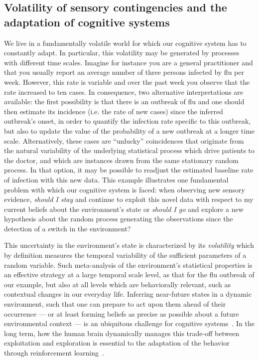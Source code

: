 \documentclass[10pt,letterpaper]{article}
\newcommand{\citep}[1]{\cite{#1}}
\newcommand{\LP}[1]{\textbf{\textcolor{red}{[LP: #1]}}}
\newcommand{\Rone}[1]{\textbf{\textcolor{magenta}{[rev 1: #1]}}}
\begin{document}
\subsection{Volatility of sensory contingencies and the adaptation of cognitive systems}
We live in a fundamentally volatile world for which
our cognitive system has to constantly adapt.
In particular, this volatility may be generated
by processes with different time scales.
Imagine for instance you are a general practitioner and
that you usually report an average number of
three persons infected by flu per week.
However, this rate is variable and
over the past week you observe that the rate increased to ten cases.
In consequence, two alternative interpretations are available:
the first possibility is that there is an outbreak of flu and
one should then estimate its incidence
(i.e. the rate of new cases)
since the inferred outbreak's onset, in order
to quantify the infection rate specific to this outbreak,
but also to update the value of %
the probability of a new outbreak %
at a longer time scale.
Alternatively, these cases are
``unlucky'' coincidences that originate from the natural variability
of the underlying statistical process which drive patients to the doctor,
and which are instances drawn from the same stationary random process.
In that option, it may be possible to readjust
the estimated baseline rate of infection with this new data.
This example illustrates one fundamental problem
with which our cognitive system is faced:
when observing new sensory evidence,
\emph{should I stay} and continue to exploit this novel data
with respect to my current beliefs about the environment's state
or \emph{should I go} and explore a new hypothesis
about the random process generating the observations
since the detection of a switch in the environment?

This uncertainty in the environment's state is characterized by its \emph{volatility}
which by definition measures the temporal variability
of the sufficient parameters of a random variable.
Such meta-analysis of the environment's statistical properties
is an effective strategy at a large temporal scale level,
as that for the flu outbreak of our example,
but also at all levels which are behaviorally relevant,
such as contextual changes in our everyday life.
Inferring near-future states in a dynamic environment,
such that one can prepare to act upon them
ahead of their occurrence ---
or at least forming beliefs as precise as possible
about a future environmental context ---
is an ubiquitous challenge for cognitive systems~\citep{Barack16}.
In the long term, how the human brain dynamically manages
this trade-off between exploitation and exploration
is essential to the adaptation
of the behavior through reinforcement learning~\citep{Cohen2007}.
\end{document}
